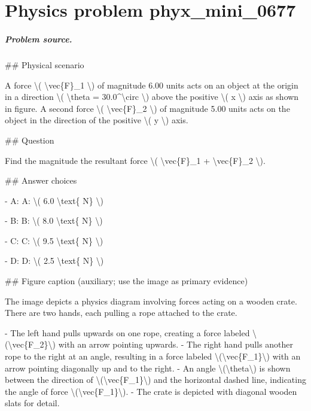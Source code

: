 
\chapter{Physics problem phyx\_mini\_0677}
\label{ch:PhyXMiniProblems_problem_phyx_mini_0677}

\paragraph{Problem source.}
\#\# Physical scenario

A force \textbackslash{}( \textbackslash{}vec\{F\}\_1 \textbackslash{}) of magnitude 6.00 units acts on an object at the origin in a direction \textbackslash{}( \textbackslash{}theta = 30.0\textasciicircum{}\textbackslash{}circ \textbackslash{}) above the positive \textbackslash{}( x \textbackslash{}) axis as shown in figure. A second force \textbackslash{}( \textbackslash{}vec\{F\}\_2 \textbackslash{}) of magnitude 5.00 units acts on the object in the direction of the positive \textbackslash{}( y \textbackslash{}) axis.

\#\# Question

Find the magnitude the resultant force \textbackslash{}( \textbackslash{}vec\{F\}\_1 + \textbackslash{}vec\{F\}\_2 \textbackslash{}).

\#\# Answer choices

- A: A: \textbackslash{}( 6.0 \textbackslash{}text\{ N\} \textbackslash{})

- B: B: \textbackslash{}( 8.0 \textbackslash{}text\{ N\} \textbackslash{})

- C: C: \textbackslash{}( 9.5 \textbackslash{}text\{ N\} \textbackslash{})

- D: D: \textbackslash{}( 2.5 \textbackslash{}text\{ N\} \textbackslash{})

\#\# Figure caption (auxiliary; use the image as primary evidence)

The image depicts a physics diagram involving forces acting on a wooden crate. There are two hands, each pulling a rope attached to the crate. 

- The left hand pulls upwards on one rope, creating a force labeled \textbackslash{}(\textbackslash{}vec\{F\_2\}\textbackslash{}) with an arrow pointing upwards.
- The right hand pulls another rope to the right at an angle, resulting in a force labeled \textbackslash{}(\textbackslash{}vec\{F\_1\}\textbackslash{}) with an arrow pointing diagonally up and to the right.
- An angle \textbackslash{}(\textbackslash{}theta\textbackslash{}) is shown between the direction of \textbackslash{}(\textbackslash{}vec\{F\_1\}\textbackslash{}) and the horizontal dashed line, indicating the angle of force \textbackslash{}(\textbackslash{}vec\{F\_1\}\textbackslash{}).
- The crate is depicted with diagonal wooden slats for detail.

